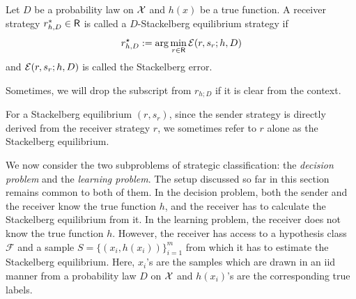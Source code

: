 \begin{defn}\label{def:Stackelberg equilibrium}
	Let $D$ be a probability law on $\mathcal{X}$ and $h(x)$ be a true function. A receiver strategy $r^*_{h,D} \in \mathsf{R}$ is called a $D$-Stackelberg equilibrium strategy if
	\begin{equation*}
		r^{\star}_{h,D} := \arg\min_{r \in \mathsf{R}}\mathcal{E}(r,s_r;h,D)
	\end{equation*}
	and $\mathcal{E}(r,s_r;h,D)$ is called the Stackelberg error.
\end{defn}
\begin{notn}
	Sometimes, we will drop the subscript from $r_{h;D}$ if it is clear from the context.
\end{notn}
\begin{notn}
	For a Stackelberg equilibrium $(r,s_r)$, since the sender strategy is directly derived from the receiver strategy $r$, we sometimes refer to $r$ alone as the Stackelberg equilibrium.
\end{notn}

We now consider the two subproblems of strategic classification: the \textit{decision problem} and the \textit{learning problem}. The setup discussed so far in this section remains common to both of them. In the decision problem, both the sender and the receiver know the true function $h$, and the receiver has to calculate the Stackelberg equilibrium from it. In the learning problem, the receiver does not know the true function $h$. However, the receiver has access to a hypothesis class $\mathcal{F}$ and a sample $S = \{(x_i, h(x_i))\}_{i=1}^m$ from which it has to estimate the Stackelberg equilibrium. Here, $x_i$'s are the samples which are drawn in an iid manner from a probability law  $D$ on $\mathcal{X}$ and $h(x_i)$'s are the corresponding true labels.
